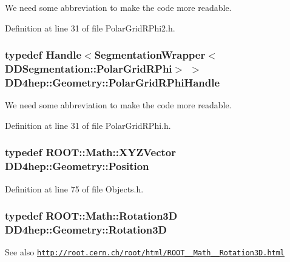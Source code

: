 We need some abbreviation to make the code more readable. 

Definition at line 31 of file PolarGridRPhi2.h.\hypertarget{namespace_d_d4hep_1_1_geometry_a3b5a44856fd99ab92095fea0764485d3}{
\subsubsection[{PolarGridRPhiHandle}]{\setlength{\rightskip}{0pt plus 5cm}typedef {\bf Handle}$<${\bf SegmentationWrapper}$<${\bf DDSegmentation::PolarGridRPhi}$>$ $>$ {\bf DD4hep::Geometry::PolarGridRPhiHandle}}}
\label{namespace_d_d4hep_1_1_geometry_a3b5a44856fd99ab92095fea0764485d3}


We need some abbreviation to make the code more readable. 

Definition at line 31 of file PolarGridRPhi.h.\hypertarget{namespace_d_d4hep_1_1_geometry_a55083902099d03506c6db01b80404900}{
\subsubsection[{Position}]{\setlength{\rightskip}{0pt plus 5cm}typedef ROOT::Math::XYZVector {\bf DD4hep::Geometry::Position}}}
\label{namespace_d_d4hep_1_1_geometry_a55083902099d03506c6db01b80404900}


Definition at line 75 of file Objects.h.\hypertarget{namespace_d_d4hep_1_1_geometry_a022fecb763315fa2bf39cbb648944a0e}{
\subsubsection[{Rotation3D}]{\setlength{\rightskip}{0pt plus 5cm}typedef ROOT::Math::Rotation3D {\bf DD4hep::Geometry::Rotation3D}}}
\label{namespace_d_d4hep_1_1_geometry_a022fecb763315fa2bf39cbb648944a0e}
\begin{DoxySeeAlso}{See also}
\href{http://root.cern.ch/root/html/ROOT__Math__Rotation3D.html}{\tt http://root.cern.ch/root/html/ROOT\_\-\_\-Math\_\-\_\-Rotation3D.html} 
\end{DoxySeeAlso}


